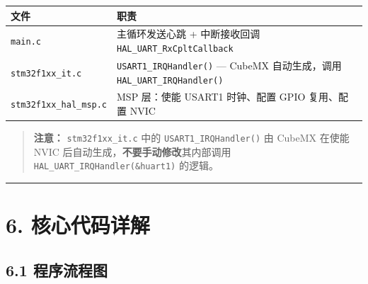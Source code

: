 \documentclass[
  chinese,
  UTF8,
  oneside,
  openany]{ctexbook}
\begin{document}
\begin{longtable}[]{@{}
  >{\raggedright\arraybackslash}p{}
  >{\raggedright\arraybackslash}p{}@{}}
\toprule\noalign{}
\begin{minipage}[b]{\linewidth}\raggedright
文件
\end{minipage} & \begin{minipage}[b]{\linewidth}\raggedright
职责
\end{minipage} \\
\midrule\noalign{}
\endhead
\bottomrule\noalign{}
\endlastfoot
\texttt{main.c} & 主循环发送心跳 + 中断接收回调
\texttt{HAL\_UART\_RxCpltCallback} \\
\texttt{stm32f1xx\_it.c} & \texttt{USART1\_IRQHandler()} --- CubeMX
自动生成，调用 \texttt{HAL\_UART\_IRQHandler()} \\
\texttt{stm32f1xx\_hal\_msp.c} & MSP 层：使能 USART1 时钟、配置 GPIO
复用、配置 NVIC \\
\end{longtable}

\begin{quote}
\textbf{注意：} \texttt{stm32f1xx\_it.c} 中的
\texttt{USART1\_IRQHandler()} 由 CubeMX 在使能 NVIC
后自动生成，\textbf{不要手动修改}其内部调用
\texttt{HAL\_UART\_IRQHandler(\&huart1)} 的逻辑。
\end{quote}

\begin{center}\rule{0.5\linewidth}{0.5pt}\end{center}

\section{6. 核心代码详解}\label{ux6838ux5fc3ux4ee3ux7801ux8be6ux89e3-1}

\subsection{6.1 程序流程图}\label{ux7a0bux5e8fux6d41ux7a0bux56fe-1}
\end{document}
